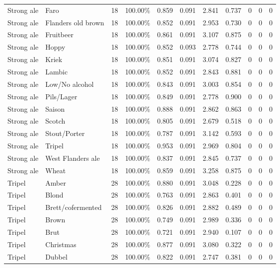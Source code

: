 {\begin{longtable}{llrrrrrrrrr}
Strong ale & Faro & 18 & 100.00\% & 0.859 & 0.091 & 2.841 & 0.737 & 0 & 0 & 0 \\
Strong ale & Flanders old brown & 18 & 100.00\% & 0.852 & 0.091 & 2.953 & 0.730 & 0 & 0 & 0 \\
Strong ale & Fruitbeer & 18 & 100.00\% & 0.861 & 0.091 & 3.107 & 0.875 & 0 & 0 & 0 \\
Strong ale & Hoppy & 18 & 100.00\% & 0.852 & 0.093 & 2.778 & 0.744 & 0 & 0 & 0 \\
Strong ale & Kriek & 18 & 100.00\% & 0.851 & 0.091 & 3.074 & 0.827 & 0 & 0 & 0 \\
Strong ale & Lambic & 18 & 100.00\% & 0.852 & 0.091 & 2.843 & 0.881 & 0 & 0 & 0 \\
Strong ale & Low/No alcohol & 18 & 100.00\% & 0.843 & 0.091 & 3.003 & 0.854 & 0 & 0 & 0 \\
Strong ale & Pils/Lager & 18 & 100.00\% & 0.849 & 0.091 & 2.778 & 0.900 & 0 & 0 & 0 \\
Strong ale & Saison & 18 & 100.00\% & 0.888 & 0.091 & 2.862 & 0.863 & 0 & 0 & 0 \\
Strong ale & Scotch & 18 & 100.00\% & 0.805 & 0.091 & 2.679 & 0.518 & 0 & 0 & 0 \\
Strong ale & Stout/Porter & 18 & 100.00\% & 0.787 & 0.091 & 3.142 & 0.593 & 0 & 0 & 0 \\
Strong ale & Tripel & 18 & 100.00\% & 0.953 & 0.091 & 2.969 & 0.804 & 0 & 0 & 0 \\
Strong ale & West Flanders ale & 18 & 100.00\% & 0.837 & 0.091 & 2.845 & 0.737 & 0 & 0 & 0 \\
Strong ale & Wheat & 18 & 100.00\% & 0.859 & 0.091 & 3.258 & 0.875 & 0 & 0 & 0 \\
Tripel & Amber & 28 & 100.00\% & 0.880 & 0.091 & 3.048 & 0.228 & 0 & 0 & 0 \\
Tripel & Blond & 28 & 100.00\% & 0.763 & 0.091 & 2.863 & 0.401 & 0 & 0 & 0 \\
Tripel & Brett/cofermented & 28 & 100.00\% & 0.826 & 0.091 & 2.882 & 0.489 & 0 & 0 & 0 \\
Tripel & Brown & 28 & 100.00\% & 0.749 & 0.091 & 2.989 & 0.336 & 0 & 0 & 0 \\
Tripel & Brut & 28 & 100.00\% & 0.721 & 0.091 & 2.940 & 0.107 & 0 & 0 & 0 \\
Tripel & Christmas & 28 & 100.00\% & 0.877 & 0.091 & 3.080 & 0.322 & 0 & 0 & 0 \\
Tripel & Dubbel & 28 & 100.00\% & 0.822 & 0.091 & 2.747 & 0.381 & 0 & 0 & 0 \\

\end{longtable}}
